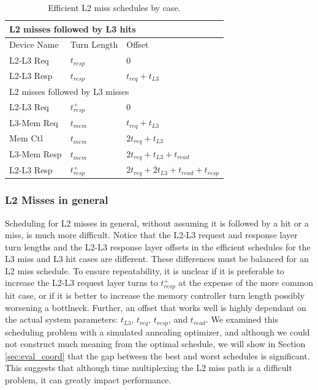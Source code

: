 \def\dc{Blue}
\begin{table}
    \caption{Efficient L2 miss schedules by case.}
    \centering
    \begin{tabular}{|r|r|l|l|}
        \hline
        \multicolumn{4}{|l|}{L2 misses followed by L3 hits}\\\hline
        \multicolumn{2}{|l|}{Device Name} & Turn Length & Offset\\\hline
        \multicolumn{2}{|l|}{L2-L3 Req}  & $t_{resp}$ & 0\\\hline
        \multicolumn{2}{|l|}{L2-L3 Resp} & $t_{resp}$ &
          $t_{req}+t_{L3}$\\\hline\hline
        \multicolumn{4}{|l|}{L2 misses followed by L3 misses}\\\hline
        \multicolumn{2}{|l|}{L2-L3 Req}   & $t_{resp}^+$ & 0\\\hline
        \multicolumn{2}{|l|}{L3-Mem Req}  & $t_{mem}$ & $t_{req}+t_{L3}$\\\hline
        \multicolumn{2}{|l|}{Mem Ctl}     & $t_{mem}$ & $2t_{req}+t_{L3}$\\\hline
        \multicolumn{2}{|l|}{L3-Mem Resp} & $t_{mem}$ & 
          $2t_{req}+t_{L3}+t_{read}$\\\hline
        \multicolumn{2}{|l|}{L2-L3 Resp}  & $t_{resp}^+$ &
          $2t_{req}+2t_{L3}+t_{read}+t_{resp}$\\\hline
    \end{tabular}
    \label{tab:l2_miss_schedules}
\end{table}

\subsubsection{L2 Misses in general}
Scheduling for L2 misses in general, without assuming it is followed by a hit 
or a miss, is much more difficult. Notice that the L2-L3 request and response 
layer turn lengths and the L2-L3 response layer offsets in the efficient 
schedules for the L3 miss and L3 hit cases are different. These differences 
must be balanced for an L2 miss schedule. To ensure repeatability, it is 
unclear if it is preferable to increase the L2-L3 request layer turns to 
$t_{resp}^+$ at the expense of the more common hit case, or if it is better to 
increase the memory controller turn length possibly worsening a bottlneck.
Further, an offset that works well is highly dependant on the actual system 
parameters: $t_{L3}$, $t_{req}$, $t_{resp}$, and $t_{read}$.
We examined this scheduling problem with a simulated annealing optimizer,
and although we could not construct much meaning from the optimal 
schedule, we will show in Section \ref{sec:eval_coord} that the gap between
the best and worst schedules is significant. This suggests that although time 
multiplexing the L2 miss path is a difficult problem, it can greatly impact 
performance.
